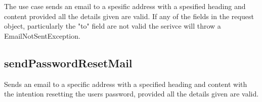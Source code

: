 The use case sends an email to a spesific address with a spesified heading and content
provided all the details given are valid. If any of the fields in the request object,
particularly the "to" field are not valid the serivce will throw a EmailNotSentException.

\subsection{sendPasswordResetMail}
Sends an email to a specific address with a specified heading and content
with the intention resetting the users password, provided all the details 
given are valid.